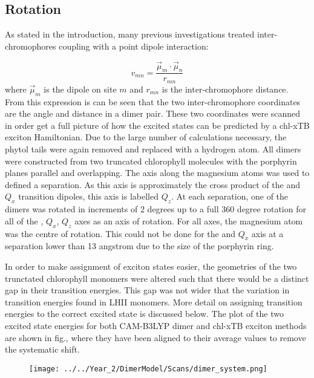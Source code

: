 \subsection{Rotation}
\label{subsec:rotation}

As stated in the introduction, many previous investigations treated inter-chromophores
coupling with a point dipole interaction:

\begin{equation}
    v_{mn} = \frac{\vec{\mu}_m \cdot \vec{\mu}_n}{r_{mn}}
\end{equation}
%
where $\vec{\mu}_m$ is the dipole on site $m$ and $r_{mn}$ is the inter-chromophore
distance. From this expression is can be seen that the two inter-chromophore coordinates
are the angle and distance in a dimer pair. These two coordinates were scanned in
order get a full picture of how the excited states can be predicted by a chl-xTB
exciton Hamiltonian. Due to the large number of calculations necessary, the phytol
tails were again removed and replaced with a hydrogen atom. All dimers were constructed
from two truncated chlorophyll molecules with the porphyrin planes parallel and 
overlapping. The axis along the magnesium atoms was used to defined a separation.
As this axis is approximately the cross product of the \Qy and $Q_x$ transition 
dipoles, this axis is labelled $Q_z$. At each separation, one of the dimers was 
rotated in increments of 2 degrees up to a full 360 degree rotation for all of the
\Qy, $Q_x$, $Q_z$ axes as an axis of rotation. For all axes, the magnesium atom
was the centre of rotation. This could not be done for the \Qy and $Q_x$ axis at
a separation lower than 13 angstrom due to the size of the porphyrin ring. 

In order to make assignment of exciton states easier, the geometries of the two 
trunctated chlorophyll monomers were altered such that there would be a distinct 
gap in their transition energies. This gap was not wider that the variation in 
transition energies found in LHII monomers. More detail on assigning transition 
energies to the correct excited state is discussed below. The plot of the two excited
state energies for both CAM-B3LYP dimer and chl-xTB exciton methods are shown in
fig., where they have been aligned to their average values to remove the systematic
shift.

\begin{figure}
    \centering
    \texttt{[image: ../../Year\_2/DimerModel/Scans/dimer\_system.png]}
\end{figure}

